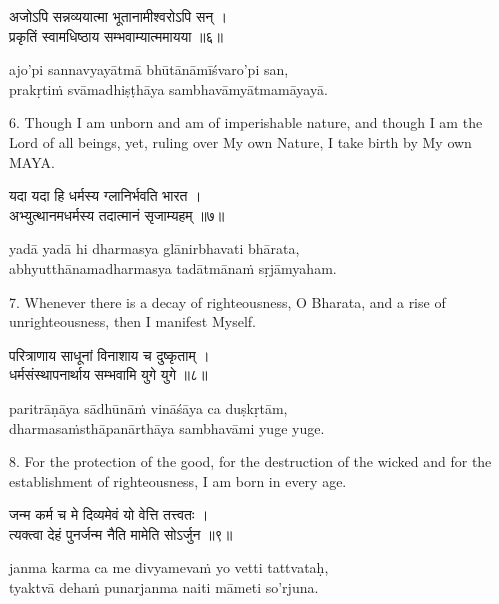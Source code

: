 \begin{gitaverse}
अजोऽपि सन्नव्ययात्मा भूतानामीश्वरोऽपि सन् । \\
प्रकृतिं स्वामधिष्ठाय सम्भवाम्यात्ममायया ॥६॥
\end{gitaverse}

\begin{transliteration}
ajo'pi sannavyayātmā bhūtānāmīśvaro'pi san, \\
prakṛtiṁ svāmadhiṣṭhāya sambhavāmyātmamāyayā.
\end{transliteration}

6. Though I am unborn and am of imperishable nature, and though I am the Lord
of all beings, yet, ruling over My own Nature, I take birth by My own MAYA.\@

\begin{gitaverse}
यदा यदा हि धर्मस्य ग्लानिर्भवति भारत । \\
अभ्युत्थानमधर्मस्य तदात्मानं सृजाम्यहम् ॥७॥
\end{gitaverse}

\begin{transliteration}
yadā yadā hi dharmasya glānirbhavati bhārata, \\
abhyutthānamadharmasya tadātmānaṁ sṛjāmyaham.
\end{transliteration}

7. Whenever there is a decay of righteousness, O Bharata, and a rise of
unrighteousness, then I manifest Myself.

\begin{gitaverse}
परित्राणाय साधूनां विनाशाय च दुष्कृताम् । \\
धर्मसंस्थापनार्थाय सम्भवामि युगे युगे ॥८॥
\end{gitaverse}

\begin{transliteration}
paritrāṇāya sādhūnāṁ vināśāya ca duṣkṛtām, \\
dharmasaṁsthāpanārthāya sambhavāmi yuge yuge.
\end{transliteration}

8. For the protection of the good, for the destruction of the wicked and for
the establishment of righteousness, I am born in every age.

\begin{gitaverse}
जन्म कर्म च मे दिव्यमेवं यो वेत्ति तत्त्वतः । \\
त्यक्त्वा देहं पुनर्जन्म नैति मामेति सोऽर्जुन ॥९॥
\end{gitaverse}

\begin{transliteration}
janma karma ca me divyamevaṁ yo vetti tattvataḥ, \\
tyaktvā dehaṁ punarjanma naiti māmeti so'rjuna.
\end{transliteration}

